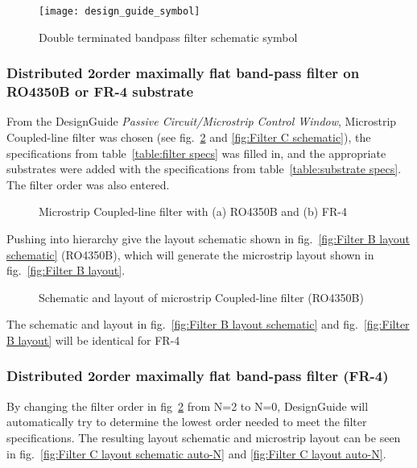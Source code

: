 \documentclass[report.tex]{subfiles}
\begin{document}
\begin{figure}[H]
    \centering
    \texttt{[image: design\_guide\_symbol]}
    \caption{Double terminated bandpass filter schematic symbol}
    \label{fig:Filter A}
\end{figure}

\subsubsection{Distributed 2\nd order maximally flat band-pass filter on RO4350B or FR-4 substrate}
From the DesignGuide \emph{Passive Circuit/Microstrip Control Window}, Microstrip Coupled-line filter was chosen (see fig.~\ref{fig:Filter B schematic} and \ref{fig:Filter C schematic}), the specifications from table~\ref{table:filter specs} was filled in, and the appropriate substrates were added with the specifications from table~\ref{table:substrate specs}. The filter order was also entered.

\begin{figure}[h]
    \centering
    \caption{Microstrip Coupled-line filter with (a) RO4350B and (b) FR-4}
    \label{fig:Filter B schematic}
\end{figure}

Pushing into hierarchy give the layout schematic shown in fig.~\ref{fig:Filter B layout schematic} (RO4350B), which will generate the microstrip layout shown in fig.~\ref{fig:Filter B layout}.

\begin{figure}[h]
    \centering
    
    \caption{Schematic and layout of microstrip Coupled-line filter (RO4350B)}
\end{figure}

The schematic and layout in fig.~\ref{fig:Filter B layout schematic} and fig.~\ref{fig:Filter B layout} will be identical for FR-4

\subsubsection{Distributed 2\nd order maximally flat band-pass filter (FR-4)}
By changing the filter order in fig~\ref{fig:Filter B schematic} from N=2 to N=0, DesignGuide will automatically try to determine the lowest order needed to meet the filter specifications. The resulting layout schematic and microstrip layout can be seen in fig.~\ref{fig:Filter C layout schematic auto-N} and \ref{fig:Filter C layout auto-N}.
\end{document}
